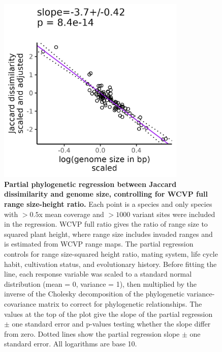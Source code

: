 \documentclass[12pt]{article}
\begin{document}
\begin{figure}[H]
    \centering
    \includegraphics[width=0.8\textwidth]{figures/appendix_d/jac_vs_genome_size_wcvp-all-corrected_2024-12-12.jpg}
    \caption{\textbf{Partial phylogenetic regression between Jaccard dissimilarity and genome size, controlling for WCVP full range size-height ratio.} Each point is a species and only species with $>0.5$x mean coverage and $>1000$ variant sites were included in the regression. WCVP full ratio gives the ratio of range size to squared plant height, where range size includes invaded ranges and is estimated from WCVP range maps. The partial regression controls for range size-squared height ratio, mating system, life cycle habit, cultivation status, and evolutionary history. Before fitting the line, each response variable was scaled to a standard normal distribution (mean = 0, variance = 1), then multiplied by the inverse of the Cholesky decomposition of the phylogenetic variance-covariance matrix to correct for phylogenetic relationships. The values at the top of the plot give the slope of the partial regression $\pm$ one standard error and p-values testing whether the slope differ from zero. Dotted lines show the partial regression slope $\pm$ one standard error. All logarithms are base 10.}
\end{figure}
\end{document}

